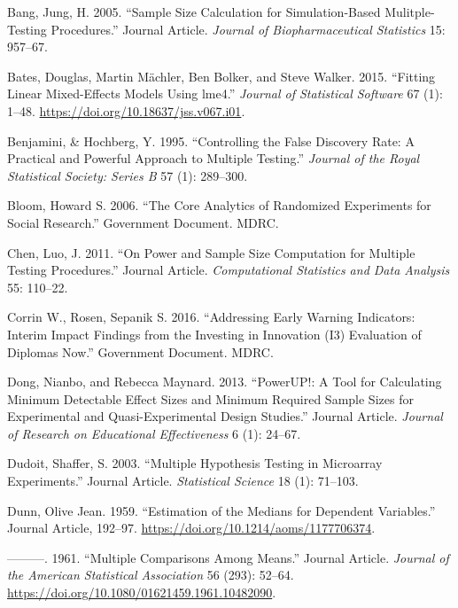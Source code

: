 \documentclass[
]{article}
\newlength{\cslhangindent}
\newenvironment{cslreferences}%
  {\setlength{\parindent}{0pt}%
  \everypar{\setlength{\hangindent}{\cslhangindent}}\ignorespaces}%
  {\par}
\begin{document}
\hypertarget{refs}{}
\begin{cslreferences}
\leavevmode\hypertarget{ref-RN33089}{}%
Bang, Jung, H. 2005. ``Sample Size Calculation for Simulation-Based
Mulitple-Testing Procedures.'' Journal Article. \emph{Journal of
Biopharmaceutical Statistics} 15: 957--67.

\leavevmode\hypertarget{ref-lme4}{}%
Bates, Douglas, Martin Mächler, Ben Bolker, and Steve Walker. 2015.
``Fitting Linear Mixed-Effects Models Using lme4.'' \emph{Journal of
Statistical Software} 67 (1): 1--48.
\url{https://doi.org/10.18637/jss.v067.i01}.

\leavevmode\hypertarget{ref-BenjaminiHochberg1995}{}%
Benjamini, \& Hochberg, Y. 1995. ``Controlling the False Discovery Rate:
A Practical and Powerful Approach to Multiple Testing.'' \emph{Journal
of the Royal Statistical Society: Series B} 57 (1): 289--300.

\leavevmode\hypertarget{ref-RN27978}{}%
Bloom, Howard S. 2006. ``The Core Analytics of Randomized Experiments
for Social Research.'' Government Document. MDRC.

\leavevmode\hypertarget{ref-RN23882}{}%
Chen, Luo, J. 2011. ``On Power and Sample Size Computation for Multiple
Testing Procedures.'' Journal Article. \emph{Computational Statistics
and Data Analysis} 55: 110--22.

\leavevmode\hypertarget{ref-DNREPORT}{}%
Corrin W., Rosen, Sepanik S. 2016. ``Addressing Early Warning
Indicators: Interim Impact Findings from the Investing in Innovation
(I3) Evaluation of Diplomas Now.'' Government Document. MDRC.

\leavevmode\hypertarget{ref-RN4473}{}%
Dong, Nianbo, and Rebecca Maynard. 2013. ``PowerUP!: A Tool for
Calculating Minimum Detectable Effect Sizes and Minimum Required Sample
Sizes for Experimental and Quasi-Experimental Design Studies.'' Journal
Article. \emph{Journal of Research on Educational Effectiveness} 6 (1):
24--67.

\leavevmode\hypertarget{ref-RN23878}{}%
Dudoit, Shaffer, S. 2003. ``Multiple Hypothesis Testing in Microarray
Experiments.'' Journal Article. \emph{Statistical Science} 18 (1):
71--103.

\leavevmode\hypertarget{ref-RN24280}{}%
Dunn, Olive Jean. 1959. ``Estimation of the Medians for Dependent
Variables.'' Journal Article, 192--97.
\url{https://doi.org/10.1214/aoms/1177706374}.

\leavevmode\hypertarget{ref-RN24281}{}%
---------. 1961. ``Multiple Comparisons Among Means.'' Journal Article.
\emph{Journal of the American Statistical Association} 56 (293): 52--64.
\url{https://doi.org/10.1080/01621459.1961.10482090}.


\end{cslreferences}
\end{document}
